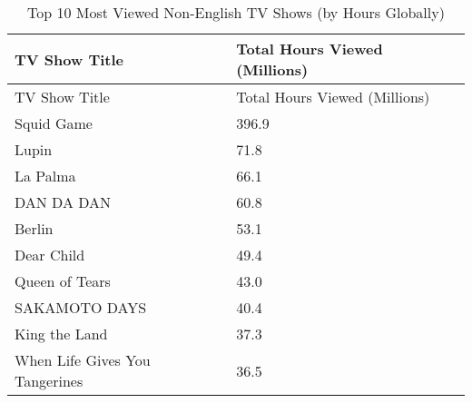 \documentclass[
  12pt,
  letterpaper,
  DIV=11,
  numbers=noendperiod]{scrartcl}
\begin{document}
\begin{longtable}[]{@{}ll@{}}
\caption{Top 10 Most Viewed Non-English TV Shows (by Hours
Globally)}\tabularnewline
\toprule\noalign{}
TV Show Title & Total Hours Viewed (Millions) \\
\midrule\noalign{}
\endfirsthead
\toprule\noalign{}
TV Show Title & Total Hours Viewed (Millions) \\
\midrule\noalign{}
\endhead
\bottomrule\noalign{}
\endlastfoot
Squid Game & 396.9 \\
Lupin & 71.8 \\
La Palma & 66.1 \\
DAN DA DAN & 60.8 \\
Berlin & 53.1 \\
Dear Child & 49.4 \\
Queen of Tears & 43.0 \\
SAKAMOTO DAYS & 40.4 \\
King the Land & 37.3 \\
When Life Gives You Tangerines & 36.5 \\
\end{longtable}
\end{document}
